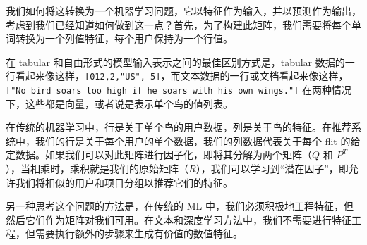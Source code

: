 \documentclass[Chinese, 11pt, table]{diazessay} %
\begin{document}
\begin{CJK}{UTF8}{gbsn}
\begin{sloppypar}
我们如何将这转换为一个机器学习问题，它以特征作为输入，并以预测作为输出，考虑到我们已经知道如何做到这一点？首先，为了构建此矩阵，我们需要将每个单词转换为一个列值特征，每个用户保持为一个行值。

\begin{flushleft}
在 tabular 和自由形式的模型输入表示之间的最佳区别方式是，tabular 数据的一行看起来像这样，\texttt{[012,2,"US", 5]}，而文本数据的一行或文档看起来像这样，\texttt{["No bird soars too high if he soars with his own wings."]} 在两种情况下，这些都是向量，或者说是表示单个鸟的值列表。
\end{flushleft}

在传统的机器学习中，行是关于单个鸟的用户数据，列是关于鸟的特征。在推荐系统中，我们的行是关于每个用户的单个数据，我们的列数据代表关于每个 flit 的给定数据。如果我们可以对此矩阵进行因子化，即将其分解为两个矩阵（$Q$ 和 $P^T$），当相乘时，乘积就是我们的原始矩阵（$R$），我们可以学习到“潜在因子”，即允许我们将相似的用户和项目分组以推荐它们的特征。

另一种思考这个问题的方法是，在传统的 ML 中，我们必须积极地工程特征，但然后它们作为矩阵对我们可用。在文本和深度学习方法中，我们不需要进行特征工程，但需要执行额外的步骤来生成有价值的数值特征。


\end{sloppypar}
\end{CJK}
\end{document}
